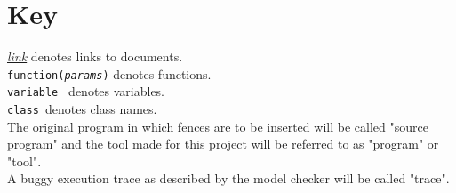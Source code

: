 \documentclass{article}
\newcommand{\var}[1]{\color{OliveGreen}\texttt{#1}\color{black}}
\newcommand{\fun}[2]{\color{Sepia}\texttt{#1(\color{Gray}\textit{#2}\color{Sepia})}\color{black}}
\newcommand{\class}[1]{\color{DarkOrchid}\texttt{#1}\color{black}}
\begin{document}
\section{Key}
\href{#4}{\textit{link}} denotes links to documents.\\
\fun{function}{params} denotes functions.\\
\var{variable } denotes variables.\\
\class{class }denotes class names.\\
The original program in which fences are to be inserted will be called "source program" and the tool made for this project will be referred to as "program" or "tool".\\
A buggy execution trace as described by the model checker will be called "trace".\\
\end{document}
